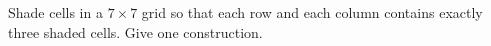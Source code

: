Shade cells in a $7\times7$ grid so that each row and each column contains exactly three shaded cells. Give one construction.
